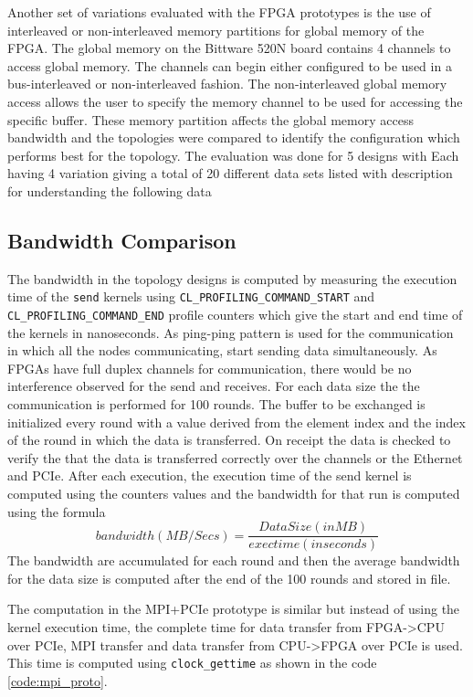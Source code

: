 Another set of variations evaluated with the FPGA prototypes is the use of
interleaved or non-interleaved memory partitions for global memory of the FPGA.
The global memory on the Bittware 520N board
contains 4 channels to access global memory. The channels can begin
either configured to be used in a bus-interleaved or non-interleaved fashion.
The non-interleaved global memory access allows the user to specify the
memory channel to be used for accessing the specific buffer. These
memory partition affects the global memory access bandwidth and
the topologies were compared to identify the configuration which performs
best for the topology. The evaluation was done for 5 designs with Each
having 4 variation giving a total of 20 different data sets listed with
description for understanding the following data

\subsection{Bandwidth Comparison}

The bandwidth in the topology designs is computed by measuring the execution time
of the \texttt{send} kernels using \texttt{CL\_PROFILING\_COMMAND\_START}
and \texttt{CL\_PROFILING\_COMMAND\_END} profile counters which give the start and
end time of the kernels in nanoseconds. As ping-ping pattern is used for the
communication in which all the nodes communicating, start sending data simultaneously.
As FPGAs have full duplex channels for communication, there would be no interference
observed for the send and receives. For each data size the the communication is performed
for 100 rounds. The buffer to be exchanged is initialized every round with a value derived from the
element index and the index of the round in which the data is transferred. On receipt
the data is checked to verify the that the data is transferred correctly over the channels
or the Ethernet and PCIe. After each execution, the execution time of the send kernel
is computed using the counters values and the bandwidth for that run is computed using the formula
$$ bandwidth (MB/Secs) = \frac{Data Size (in MB)}{exectime (in seconds)} $$
The bandwidth are accumulated for each round and then the average bandwidth for the
data size is computed after the end of the 100 rounds and stored in file.

The computation in the MPI+PCIe prototype is similar but instead of using the kernel execution
time, the complete time for data transfer from FPGA->CPU over PCIe, MPI transfer and data transfer from
CPU->FPGA over PCIe is used. This time is computed using \texttt{clock\_gettime} as shown in the code
\ref{code:mpi_proto}.

